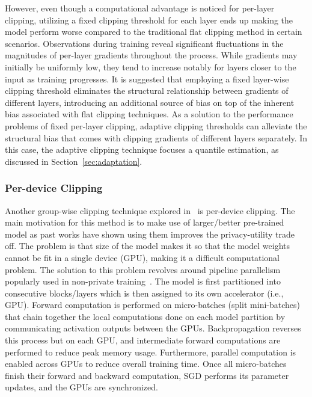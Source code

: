 However, even though a computational advantage is noticed for per-layer clipping, utilizing a fixed clipping threshold for each layer ends up making the model perform worse compared to the traditional flat clipping method in certain scenarios. Observations during training reveal significant fluctuations in the magnitudes of per-layer gradients throughout the process. While gradients may initially be uniformly low, they tend to increase notably for layers closer to the input as training progresses. It is suggested that employing a fixed layer-wise clipping threshold eliminates the structural relationship between gradients of different layers, introducing an additional source of bias on top of the inherent bias associated with flat clipping techniques. As a solution to the performance problems of fixed per-layer clipping, adaptive clipping thresholds can alleviate the structural bias that comes with clipping gradients of different layers separately. In this case, the adaptive clipping technique focuses a quantile estimation, as discussed in Section~\ref{sec:adaptation}.

\subsubsection{Per-device Clipping}

Another group-wise clipping technique explored in~\cite{RefWorks:RefID:39-he2022exploring} is per-device clipping. The main motivation for this method is to make use of larger/better pre-trained model as past works have shown using them improves the privacy-utility trade off. The problem is that size of the model makes it so that the model weights cannot be fit in a single device (GPU), making it a difficult computational problem. The solution to this problem revolves around pipeline parallelism popularly used in non-private training~\cite{RefWorks:RefID:50-huanggpipe:}. The model is first partitioned into consecutive blocks/layers which is then assigned to its own accelerator (i.e., GPU). Forward computation is performed on micro-batches (split mini-batches) that chain together the local computations done on each model partition by communicating activation outputs between the GPUs. Backpropagation reverses this process but on each GPU, and intermediate forward computations are performed to reduce peak memory usage. Furthermore, parallel computation is enabled across GPUs to reduce overall training time. Once all micro-batches finish their forward and backward computation, SGD performs its parameter updates, and the GPUs are synchronized.

